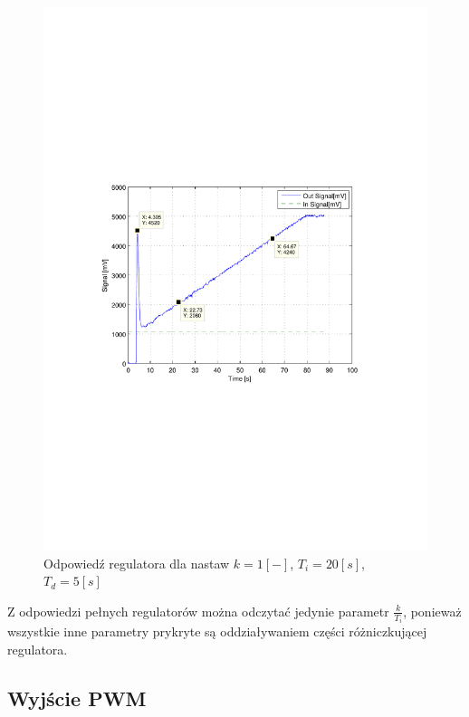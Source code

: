\documentclass[12pt]{article}
\begin{document}
\begin{figure}[!htb]
	\begin{center}
		\includegraphics[width=12cm,trim=3cm 9cm 3cm 9cm,clip]
		{../res/img/cont_1_20_5.pdf}
	\end{center} 
	\caption{Odpowiedź regulatora dla nastaw $k=1[-]$, $T_i=20[s]$,
	$T_d=5[s]$}
\end{figure}

Z odpowiedzi pełnych regulatorów można odczytać jedynie parametr
$\frac{k}{T_i}$, ponieważ wszystkie inne parametry prykryte są oddziaływaniem
części różniczkującej regulatora.

\newpage

\subsection{Wyjście PWM}
\end{document}
